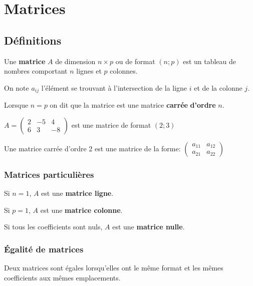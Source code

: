 \documentclass[french]{book}
\begin{document}
\tableofcontents
\chapter{Matrices}

 \section{Définitions}

\begin{defn}
Une \textbf{matrice} $A$ de dimension $n\times p$ ou de format $(n;p)$ est un tableau de nombres comportant $n$ lignes et $p$ colonnes.
   
   On note $a_{ij}$ l'élément se trouvant à l'intersection de la ligne $i$ et de la colonne $j$.
   
   Lorsque $n=p$ on dit que la matrice est une matrice \textbf{carrée} \textbf{d'ordre} $n$.
   
\end{defn} 

\begin{exemple}
   
    $A=\begin{pmatrix}
    2 & -5 & 4 \\ 
   6 & 3 & -8
   \end{pmatrix} $ est une matrice de format $(2;3)$
   
   Une matrice carrée d'ordre 2 est une matrice de la forme: $\begin{pmatrix}
    a_{11} & a_{12}  \\ 
   a_{21} & a_{22} 
   \end{pmatrix}$
   
\end{exemple}
   
\subsection{Matrices particulières}
   
    Si $n=1$, $A$ est une \textbf{matrice ligne}.
   
     Si $p=1$, $A$ est une \textbf{matrice colonne}.
   
    Si tous les coefficients sont nuls, $A$ est une \textbf{matrice nulle}.
   
\subsection{Égalité de matrices}
   \begin{defn}
   
    Deux matrices sont égales lorsqu'elles ont le même format et les mêmes coefficients aux mêmes emplacements.
   
   \end{defn}
   
\end{document}
